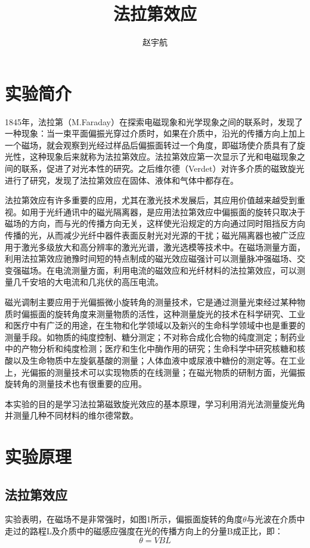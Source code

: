 \documentclass[hyperref]{ctexart}
\title{\textbf{法拉第效应}}
\author{\sffamily 赵宇航}
\date{}
\begin{document}
\maketitle
	\section{实验简介}
	1845年，法拉第（M.Faraday）在探索电磁现象和光学现象之间的联系时，发现了一种现象：当一束平面偏振光穿过介质时，如果在介质中，沿光的传播方向上加上一个磁场，就会观察到光经过样品后偏振面转过一个角度，即磁场使介质具有了旋光性，这种现象后来就称为法拉第效应。法拉第效应第一次显示了光和电磁现象之间的联系，促进了对光本性的研究。之后维尔德（Verdet）对许多介质的磁致旋光进行了研究，发现了法拉第效应在固体、液体和气体中都存在。

	法拉第效应有许多重要的应用，尤其在激光技术发展后，其应用价值越来越受到重视。如用于光纤通讯中的磁光隔离器，是应用法拉第效应中偏振面的旋转只取决于磁场的方向，而与光的传播方向无关，这样使光沿规定的方向通过同时阻挡反方向传播的光，从而减少光纤中器件表面反射光对光源的干扰；磁光隔离器也被广泛应用于激光多级放大和高分辨率的激光光谱，激光选模等技术中。在磁场测量方面，利用法拉第效应驰豫时间短的特点制成的磁光效应磁强计可以测量脉冲强磁场、交变强磁场。在电流测量方面，利用电流的磁效应和光纤材料的法拉第效应，可以测量几千安培的大电流和几兆伏的高压电流。

	磁光调制主要应用于光偏振微小旋转角的测量技术，它是通过测量光束经过某种物质时偏振面的旋转角度来测量物质的活性，这种测量旋光的技术在科学研究、工业和医疗中有广泛的用途，在生物和化学领域以及新兴的生命科学领域中也是重要的测量手段。如物质的纯度控制、糖分测定；不对称合成化合物的纯度测定；制药业中的产物分析和纯度检测；医疗和生化中酶作用的研究；生命科学中研究核糖和核酸以及生命物质中左旋氨基酸的测量；人体血液中或尿液中糖份的测定等。在工业上，光偏振的测量技术可以实现物质的在线测量；在磁光物质的研制方面，光偏振旋转角的测量技术也有很重要的应用。

	本实验的目的是学习法拉第磁致旋光效应的基本原理，学习利用消光法测量旋光角并测量几种不同材料的维尔德常数。
	\section{实验原理}
	\subsection{法拉第效应}
	实验表明，在磁场不是非常强时，如图1所示，偏振面旋转的角度$\theta$与光波在介质中走过的路程L及介质中的磁感应强度在光的传播方向上的分量B成正比，即：
	\begin{equation}
	\theta=VBL
	\end{equation}
\end{document}
